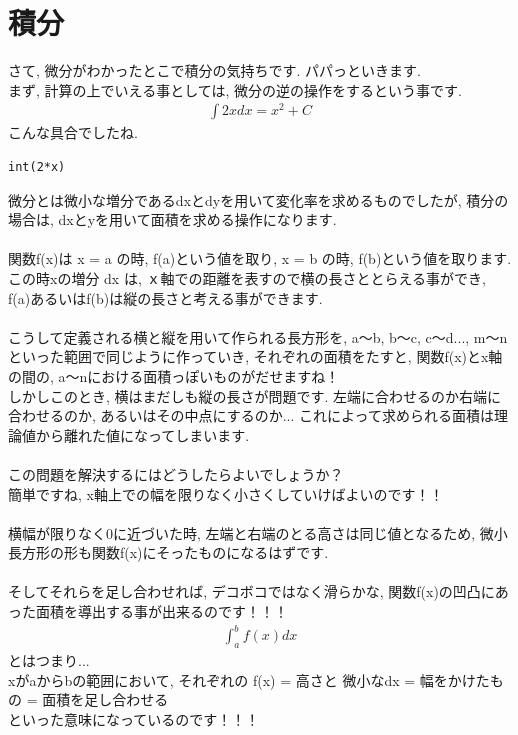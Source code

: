 \documentclass[11pt,a4paper]{jreport}
\begin{document}
\section{積分}
さて, 微分がわかったとこで積分の気持ちです. パパっといきます.\\
まず, 計算の上でいえる事としては, 微分の逆の操作をするという事です.
\begin{eqnarray}
\label{eq:int}
\int 2x dx= x^2 + C
\end{eqnarray}
こんな具合でしたね. \\


\begin{lstlisting}[caption=\ref{eq:int}のコード,label=sc:int]
int(2*x)
\end{lstlisting}


微分とは微小な増分であるdxとdyを用いて変化率を求めるものでしたが, 積分の場合は, dxとyを用いて面積を求める操作になります.\\
\\
関数f(x)は x = a の時, f(a)という値を取り, x = b の時, f(b)という値を取ります. この時xの増分 dx は, ｘ軸での距離を表すので横の長さととらえる事ができ, f(a)あるいはf(b)は縦の長さと考える事ができます.\\
\\
こうして定義される横と縦を用いて作られる長方形を, a～b, b～c, c～d..., m～nといった範囲で同じように作っていき, それぞれの面積をたすと, 関数f(x)とx軸の間の, a～nにおける面積っぽいものがだせますね！\\
しかしこのとき, 横はまだしも縦の長さが問題です. 左端に合わせるのか右端に合わせるのか, あるいはその中点にするのか... これによって求められる面積は理論値から離れた値になってしまいます.\\
\\
この問題を解決するにはどうしたらよいでしょうか？\\
簡単ですね, x軸上での幅を限りなく小さくしていけばよいのです！！\\
\\
横幅が限りなく0に近づいた時, 左端と右端のとる高さは同じ値となるため, 微小長方形の形も関数f(x)にそったものになるはずです.\\
\\
そしてそれらを足し合わせれば, デコボコではなく滑らかな, 関数f(x)の凹凸にあった面積を導出する事が出来るのです！！！
\begin{eqnarray}
\label{eq:int2}
\int_a^b f(x) dx
\end{eqnarray}
とはつまり...\\
xがaからbの範囲において, それぞれの f(x) = 高さと 微小なdx = 幅をかけたもの = 面積を足し合わせる\\
といった意味になっているのです！！！
\end{document}
